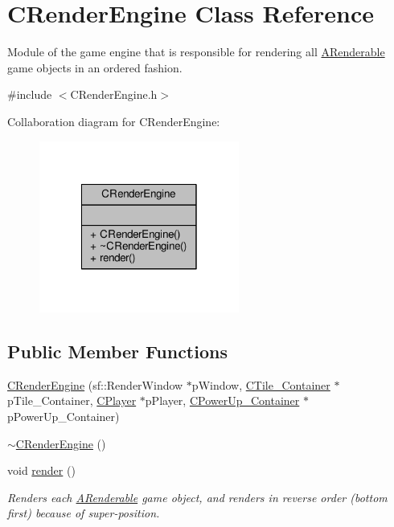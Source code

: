 \hypertarget{classCRenderEngine}{\section{C\-Render\-Engine Class Reference}
\label{classCRenderEngine}
}


Module of the game engine that is responsible for rendering all \hyperlink{classARenderable}{A\-Renderable} game objects in an ordered fashion.  




{\ttfamily \#include $<$C\-Render\-Engine.\-h$>$}



Collaboration diagram for C\-Render\-Engine\-:\nopagebreak
\begin{figure}[H]
\begin{center}
\leavevmode
\includegraphics[width=186pt]{classCRenderEngine__coll__graph}
\end{center}
\end{figure}
\subsection*{Public Member Functions}
\begin{DoxyCompactItemize}
\item 
\hyperlink{classCRenderEngine_a31d5b902cd64ab8be690e655b5c953d2}{C\-Render\-Engine} (sf\-::\-Render\-Window $\ast$p\-Window, \hyperlink{classCTile__Container}{C\-Tile\-\_\-\-Container} $\ast$p\-Tile\-\_\-\-Container, \hyperlink{classCPlayer}{C\-Player} $\ast$p\-Player, \hyperlink{classCPowerUp__Container}{C\-Power\-Up\-\_\-\-Container} $\ast$p\-Power\-Up\-\_\-\-Container)
\item 
\hyperlink{classCRenderEngine_aa30932df40eda7760a6357308eb7edac}{$\sim$\-C\-Render\-Engine} ()
\item 
void \hyperlink{classCRenderEngine_a38c058de2a8b54f208decdaa7b799ada}{render} ()
\begin{DoxyCompactList}\small\item\em Renders each \hyperlink{classARenderable}{A\-Renderable} game object, and renders in reverse order (bottom first) because of super-\/position. \end{DoxyCompactList}\end{DoxyCompactItemize}


